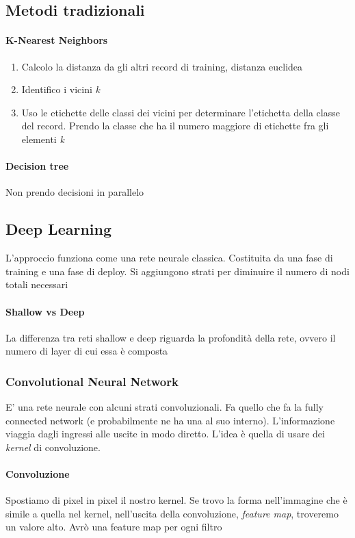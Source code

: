 \subsection{Metodi tradizionali}

\paragraph{K-Nearest Neighbors}
\begin{enumerate}
    \item Calcolo la distanza da gli altri record di training, distanza euclidea
    \item Identifico i vicini \textit{k}
    \item Uso le etichette delle classi dei vicini per determinare l'etichetta della classe del record. Prendo la classe che ha il numero maggiore di etichette fra gli elementi \textit{k}
\end{enumerate}

\paragraph{Decision tree}
Non prendo decisioni in parallelo

\subsection{Deep Learning}
L’approccio funziona come una rete neurale classica. Costituita da una fase di training e una fase di deploy. Si aggiungono strati per diminuire il numero di nodi totali necessari

\paragraph{Shallow vs Deep} 
La differenza tra reti shallow e deep riguarda la profondità della rete, ovvero il numero di layer di cui essa è composta

\subsubsection{Convolutional Neural Network}
E' una rete neurale con alcuni strati convoluzionali. Fa quello che fa la fully connected network (e probabilmente ne ha una al suo interno). L’informazione viaggia dagli ingressi alle uscite in modo diretto. L’idea è quella di usare dei \textit{kernel} di convoluzione.

\paragraph{Convoluzione}
Spostiamo di pixel in pixel il nostro kernel. Se trovo la forma nell’immagine che è simile a quella nel kernel, nell’uscita della convoluzione, \textit{feature map}, troveremo un valore alto. Avrò una feature map per ogni filtro

